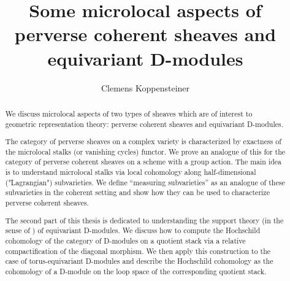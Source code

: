 \documentclass[english]{thesis}
\title{Some microlocal aspects of perverse coherent sheaves and equivariant D-modules}
\author{Clemens Koppensteiner}
\begin{document}
\frontmatter

\maketitlepage

\begin{abstract}
    We discuss microlocal aspects of two types of sheaves which are of interest to geometric representation theory: perverse coherent sheaves and equivariant D-modules.

    The category of perverse sheaves on a complex variety is characterized by exactness of the microlocal stalks (or vanishing cycles) functor.
    We prove an analogue of this for the category of perverse coherent sheaves on a scheme with a group action.
    The main idea is to understand microlocal stalks via local cohomology along half-dimensional ("Lagrangian") subvarieties.
    We define \enquote{measuring subvarieties} as an analogue of these subvarieties in the coherent setting and show how they can be used to characterize perverse coherent sheaves.

    The second part of this thesis is dedicated to understanding the support theory (in the sense of \cite{BensonIyengarKrause:2008:LocalCohomologyAndSupportForTriangulatedCategories}) of equivariant D-modules.
    We discuss how to compute the Hochschild cohomology of the category of D-modules on a quotient stack via a relative compactification of the diagonal morphism.
    We then apply this construction to the case of torus-equivariant D-modules and describe the Hochschild cohomology as the cohomology of a D-module on the loop space of the corresponding quotient stack.
\end{abstract}



\tableofcontents

\mainmatter





\backmatter

\printbibliography
\end{document}
